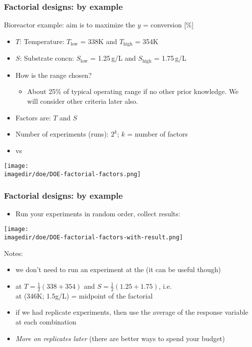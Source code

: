 \begin{frame}\frametitle{Factorial designs: by example}

	Bioreactor example: aim is to maximize the $y$ = conversion [\%]
	\begin{itemize}
		\item	$T$: Temperature: $T_\text{low}$ = 338K and $T_\text{high}$ = 354K
		\item	$S$: Substrate concn: $S_\text{low}$ = 1.25\,g/L and $S_\text{high}$ = 1.75\,g/L
		\item	How is the range chosen?
		\begin{itemize}
			\item	About 25\% of typical operating range if no other prior knowledge. We will consider other criteria later also.
		\end{itemize}
	\end{itemize}
	\begin{itemize}
		\item	Factors are: $T$ and $S$
		\item	Number of experiments ({\color{purple}runs}): $2^k$; $k$ = number of factors
		\item	{\color{purple}{Standard order}} vs {\color{purple}{Actual execution (run) order}}
	\end{itemize}
	\begin{center}
		\texttt{[image: \\imagedir/doe/DOE-factorial-factors.png]}
	\end{center}
\end{frame}

\begin{frame}\frametitle{Factorial designs: by example}
	\begin{itemize}
		\item	Run your experiments in random order, collect results:
	\end{itemize}
	\begin{center}
		\texttt{[image: \\imagedir/doe/DOE-factorial-factors-with-result.png]}
	\end{center}
	Notes:
	\begin{itemize}
		\item	we don't need to run an experiment at the {\color{purple}{baseline}} (it can be useful though)
		\item	{\color{purple}{baseline}} at $T=\frac{1}{2}\left(338+354\right)$ and $S = \frac{1}{2}\left(1.25+1.75\right)$, i.e. \\
		        {\color{purple}{baseline}} at (346K; 1.5g/L) = midpoint of the factorial
		\item	if we had replicate experiments, then use the average of the response variable at each combination
		\item	\emph{More on replicates later} (there are better ways to spend your budget)
	\end{itemize}
\end{frame}

